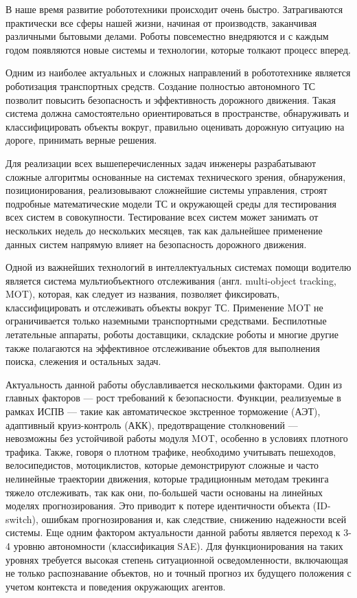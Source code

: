 
В наше время развитие робототехники происходит очень быстро. Затрагиваются практически все сферы нашей жизни, начиная от производств, заканчивая различными бытовыми делами. Роботы повсеместно внедряются и с каждым годом появляются новые системы и технологии, которые толкают процесс вперед.
 
Одним из наиболее актуальных и сложных направлений в робототехнике является роботизация транспортных средств. Создание полностью автономного ТС позволит повысить безопасность и эффективность дорожного движения. Такая система должна самостоятельно ориентироваться в пространстве, обнаруживать и классифицировать объекты вокруг, правильно оценивать дорожную ситуацию на дороге, принимать верные решения.

Для реализации всех вышеперечисленных задач инженеры разрабатывают сложные алгоритмы основанные на системах технического зрения, обнаружения, позиционирования, реализовывают сложнейшие системы управления, строят подробные математические модели ТС и окружающей среды для тестирования всех систем в совокупности. Тестирование всех систем может занимать от нескольких недель до нескольких месяцев, так как дальнейшее применение данных систем напрямую влияет на безопасность дорожного движения.

Одной из важнейших технологий в интеллектуальных системах помощи водителю является система мультиобъектного отслеживания (англ. multi-object tracking, MOT), которая, как следует из названия, позволяет фиксировать, классифицировать и отслеживать объекты вокруг ТС. Применение MOT не ограничивается только наземными транспортными средствами. Беспилотные летательные аппараты, роботы доставщики, складские роботы и многие другие также полагаются на эффективное отслеживание объектов для выполнения поиска, слежения и остальных задач. 

Актуальность данной работы обуславливается несколькими факторами. Один из главных факторов --- рост требований к безопасности. Функции, реализуемые в рамках ИСПВ — такие как автоматическое экстренное торможение (АЭТ), адаптивный круиз-контроль (АКК), предотвращение столкновений — невозможны без устойчивой работы модуля MOT, особенно в условиях плотного трафика. Также, говоря о плотном трафике, необходимо учитывать пешеходов, велосипедистов, мотоциклистов, которые демонстрируют сложные и часто нелинейные траектории движения, которые традиционным методам трекинга тяжело отслеживать, так как они, по-большей части основаны на линейных моделях прогнозирования. Это приводит к потере идентичности объекта (ID-switch), ошибкам прогнозирования и, как следствие, снижению надежности всей системы.
Еще одним фактором актуальности данной работы является переход к 3-4 уровню автономности (классификация SAE). Для функционирования на таких уровнях требуется высокая степень ситуационной осведомленности, включающая не только распознавание объектов, но и точный прогноз их будущего положения с учетом контекста и поведения окружающих агентов.

